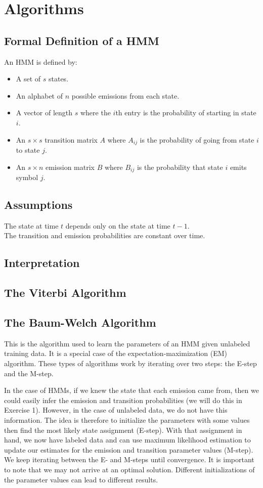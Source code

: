 \documentclass[11pt, oneside]{article}
\begin{document}
\section{Algorithms}
\subsection{Formal Definition of a HMM}
An HMM is defined by:
\begin{itemize}
\item A set of $s$ states.
\item An alphabet of $n$ possible emissions from each state.
\item A vector of length $s$ where the $i$th entry is the probability of starting in state $i$.
\item An $s\times s$ transition matrix $A$ where $A_{ij}$ is the probability of going from state $i$ to state $j$.
\item An $s \times n$ emission matrix $B$ where $B_{ij}$ is the probability that state $i$ emits symbol $j$.
\end{itemize}

\subsection{Assumptions}
The state at time $t$ depends only on the state at time $t-1$.\\
The transition and emission probabilities are constant over time.
\subsection{Interpretation}
\subsection{The Viterbi Algorithm}
\subsection{The Baum-Welch Algorithm}

This is the algorithm used to learn the parameters of an HMM given unlabeled training data. 
It is a special case of the expectation-maximization (EM) algorithm. These types of algorithms work by iterating over two steps: the E-step and the M-step.

In the case of HMMs, if we knew the state that each emission came from, then we could easily infer the emission and transition probabilities (we will do this in Exercise 1). However, in the case of unlabeled data, we do not have this information. The idea is therefore to initialize the parameters with some values then find the most likely state assignment (E-step). With that assignment in hand, we now have labeled data and can use maximum likelihood estimation to update our estimates for the emission and transition parameter values (M-step). We keep iterating between the E- and M-steps until convergence. It is important to note that we may not arrive at an optimal solution. Different initializations of the parameter values can lead to different results.
\end{document}
